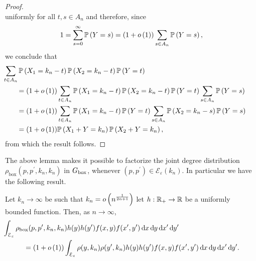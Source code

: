 \begin{proof}
\[\] 
uniformly for all $t, s \in A_n$ and therefore, since
\[
	1 = \sum_{s = 0}^\infty \mathbb{P}\left(Y = s\right) = (1+o\left(1\right)) \sum_{s \in A_n} \mathbb{P}\left(Y = s\right),
\]
we conclude that
\begin{align*}
	&\hspace{-20pt}\sum_{t \in A_n} \Prob{X_1 = k_n - t}\Prob{X_2 = k_n - t}\Prob{Y = t}\\
	&= (1+\smallO{1}) \sum_{t \in A_n} \Prob{X_1 = k_n - t}\Prob{X_2 = k_n - t}\Prob{Y = t} \sum_{s \in A_n} \Prob{Y = s}\\
	&= (1 + \smallO{1}) \sum_{t \in A_n} \Prob{X_1 = k_n - t}\Prob{Y = t} 
		\sum_{s \in A_n} \Prob{X_2 = k_n - s} \Prob{Y = s}\\
	&= (1 + \smallO{1}) \Prob{X_1 + Y = k_n} \Prob{X_2 + Y = k_n},
\end{align*}
from which the result follows.
\end{proof}

The above lemma makes it possible to factorize the joint degree distribution $\rho_{\text{box}}(p,p^\prime,k_n,k_n)$ in $G_{\text{box}}$, whenever $(p,p^\prime) \in \mathcal{E}_\varepsilon(k_n)$. In particular we have the following result.

\begin{lemma}\label{lem:joint_degree_factorization}
Let $k_n \to \infty$ be such that $k_n = o\left(n^{\frac{1}{2\alpha + 1}}\right)$ let $h : {\mathbb R}_+ \to {\ensuremath{\mathbb R}}$ be a uniformly bounded function. Then, as $n \to \infty$,
\begin{align*}
	&\hspace{-30pt}\int_{\mathcal{E}_\varepsilon} \rho_{\text{box}}(p,p^\prime,k_n,k_n) h(y)h(y^\prime) 
		f(x,y)	f(x^\prime,y^\prime) \dd x \dd y \dd x^\prime \dd y^\prime\\
	&= (1+\smallO{1})\int_{\mathcal{E}_\varepsilon} \rho(y,k_n)\rho(y^\prime,k_n) h(y)h(y^\prime) 
		f(x,y)	f(x^\prime,y^\prime) \dd x \dd y \dd x^\prime \dd y^\prime.
\end{align*}
\end{lemma}

